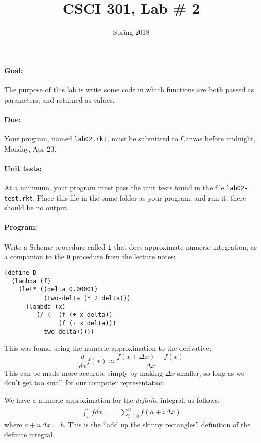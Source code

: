 \documentclass{article}
\title{CSCI 301, Lab \# 2}
\author{Spring 2018}
\date{}
\begin{document}
\maketitle
\begin{multicols}{2}


\paragraph{Goal:} The purpose of this lab is write some  code in 
  which functions are both passed as parameters, and returned as values. 

\paragraph{Due:} Your program, named {\tt lab02.rkt}, must be submitted to
  Canvas before midnight, Monday, Apr 23.

  \paragraph{Unit tests:}
  At a minimum, your program must pass the unit tests found in the
  file {\tt lab02-test.rkt}.  Place this file in the same folder
  as your program, and run it;  there should be no output.

\paragraph{Program:} Write a {\sc Scheme} procedure called {\tt I} that
  does approximate numeric integration, as a companion to the {\tt D}
  procedure from the lecture notes:
  \begin{Verbatim}[frame=single]
(define D
  (lambda (f)
    (let* ((delta 0.00001)
           (two-delta (* 2 delta)))
      (lambda (x)
         (/ (- (f (+ x delta))
               (f (- x delta)))
           two-delta)))))
  \end{Verbatim}
  This was found using the numeric approximation to the derivative:
  \[
  \frac{d}{dx} f(x) \approx \frac{f(x+\Delta x) - f(x)}{\Delta x}
  \]
  This can be made more accurate simply by making $\Delta x$ smaller,
  so long as we don't get too small for our computer representation.
  
  We have a numeric approximation for the {\em definite} integral, as
  follows:
\begin{eqnarray}
  \int_a^b f dx  &=&  \sum _{i=0}^{n} f(a+i\Delta x) \label{summation}
\end{eqnarray}
where $a+n\Delta x = b$.  This is the ``add up the skinny rectangles''
definition of the definite integral.


\end{multicols}
\end{document}
